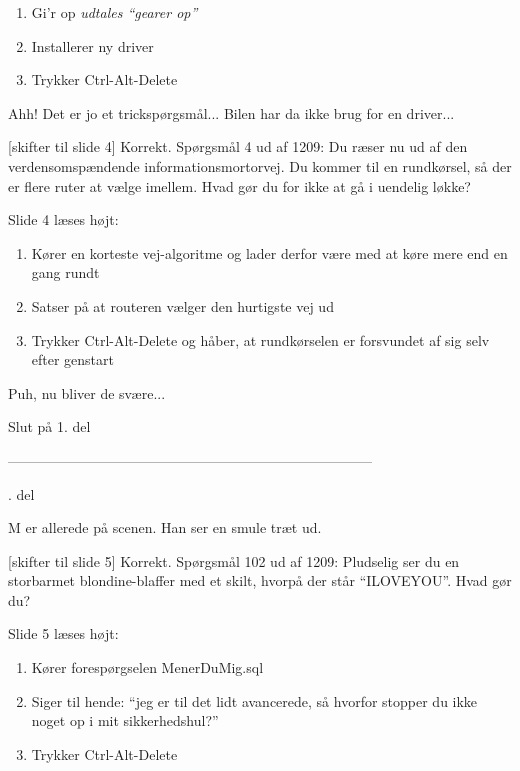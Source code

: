 \documentclass[danish]{article}
\begin{document}
\begin{sketch}
\begin{enumerate}
\item Gi'r op \emph{udtales ``gearer op''}
\item Installerer ny driver
\item Trykker Ctrl-Alt-Delete
\end{enumerate}

 Ahh! Det er jo et trickspørgsmål... Bilen har da ikke brug for en
driver... 

[skifter til slide 4] Korrekt. Spørgsmål 4 ud af 1209: Du ræser nu ud af
den verdensomspændende informationsmortorvej. Du kommer til en rundkørsel, så
der er flere ruter at vælge imellem. Hvad gør du for ikke at gå i uendelig
løkke? 

\scene Slide 4 læses højt:

\begin{enumerate}
\item Kører en korteste vej-algoritme og lader derfor være med at køre mere end
  en gang rundt
\item Satser på at routeren vælger den hurtigste vej ud
\item Trykker Ctrl-Alt-Delete og håber, at rundkørselen er forsvundet af sig
  selv efter genstart
\end{enumerate}

 Puh, nu bliver de svære... 

\scene Slut på 1. del

\scene ------------------------------------------------------------------------------

. del

\scene M er allerede på scenen. Han ser en smule træt ud.

[skifter til slide 5] Korrekt. Spørgsmål 102 ud af 1209: Pludselig ser
du en storbarmet blondine-blaffer med et skilt, hvorpå der står ``ILOVEYOU''.
Hvad gør du? 

\scene Slide 5 læses højt:

\begin{enumerate}
\item Kører forespørgselen MenerDuMig.sql
\item Siger til hende: ``jeg er til det lidt avancerede, så hvorfor stopper du
  ikke noget op i mit sikkerhedshul?''
\item Trykker Ctrl-Alt-Delete
\end{enumerate}


\end{sketch}
\end{document}

